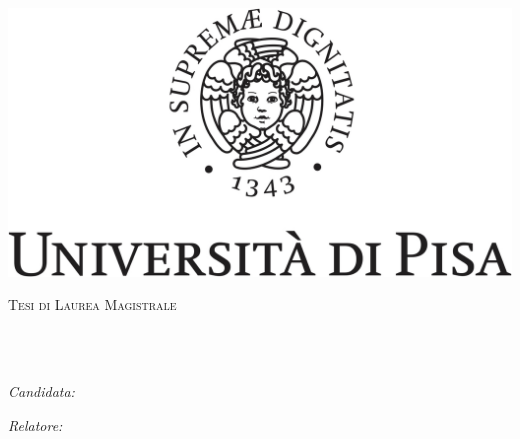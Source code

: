 \documentclass[
12pt, %
english, %
onehalfspacing, %
nohyperref, %
headsepline, %
]{MastersDoctoralThesis} %
\author{Francesca \textsc{Collu}} %
\begin{document}
\frontmatter %

\pagestyle{plain} %


\begin{titlepage}
\begin{center}

\vspace*{.06\textheight}
\includegraphics[scale=0.1]{Figures/marchio_unipi_black}
{\scshape\LARGE \univname\par}\vspace{1.5cm} %
\textsc{\Large Tesi di Laurea Magistrale}\\[0.5cm] %

\HRule \\[0.4cm] %
{\huge \bfseries \ttitle\par}\vspace{0.4cm} %
\HRule \\[1.5cm] %
 
\begin{minipage}[t]{0.4\textwidth}
\begin{flushleft} \large
\emph{Candidata:}\\
\href{http://www.johnsmith.com}{\authorname} %
\end{flushleft}
\end{minipage}
\begin{minipage}[t]{0.4\textwidth}
\begin{flushright} \large
\emph{Relatore:} \\
\href{http://www.jamessmith.com}{\supname} %
\end{flushright}
\end{minipage}\\[3cm]
 

\end{center}
\end{titlepage}
\end{document}
